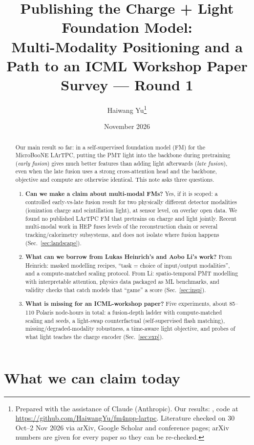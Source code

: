 \documentclass[11pt,a4paper]{article}
\title{\textbf{Publishing the Charge + Light Foundation Model:\\ Multi-Modality Positioning and a Path to an ICML Workshop Paper}\\[4pt]
\large Survey --- Round 1}
\author{Haiwang Yu\thanks{Prepared with the assistance of Claude (Anthropic). Our results: \code{docs/technote-round\{1,2,3,4\}.pdf}, code at \url{https://github.com/HaiwangYu/fm4npp-lartpc}. Literature checked on 30 Oct--2 Nov 2026 via arXiv, Google Scholar and conference pages; arXiv numbers are given for every paper so they can be re-checked.}}
\date{November 2026}
\begin{document}
\maketitle

\begin{abstract}
\noindent
Our main result so far: in a self-supervised foundation model (FM) for the MicroBooNE LArTPC, putting the PMT light into the backbone during pretraining (\emph{early fusion}) gives much better features than adding light afterwards (\emph{late fusion}), even when the late fusion uses a strong cross-attention head and the backbone, objective and compute are otherwise identical. This note asks three questions.
\begin{enumerate}
  \item \textbf{Can we make a claim about multi-modal FMs?} Yes, if it is scoped: a controlled early-vs-late fusion result for two physically different detector modalities (ionization charge and scintillation light), at sensor level, on overlay open data. We found no published LArTPC FM that pretrains on charge and light jointly. Recent multi-modal work in HEP fuses levels of the reconstruction chain or several tracking/calorimetry subsystems, and does not isolate where fusion happens (Sec.~\ref{sec:landscape}).
  \item \textbf{What can we borrow from Lukas Heinrich's and Aobo Li's work?} From Heinrich: masked modelling recipes, ``task = choice of input/output modalities'', and a compute-matched scaling protocol. From Li: spatio-temporal PMT modelling with interpretable attention, physics data packaged as ML benchmarks, and validity checks that catch models that ``game'' a score (Sec.~\ref{sec:insp}).
  \item \textbf{What is missing for an ICML-workshop paper?} Five experiments, about 85--110 Polaris node-hours in total: a fusion-depth ladder with compute-matched scaling and seeds, a light-swap counterfactual (self-supervised flash matching), missing/degraded-modality robustness, a time-aware light objective, and probes of what light teaches the charge encoder (Sec.~\ref{sec:exp}).
\end{enumerate}
\end{abstract}

\section{What we can claim today}\label{sec:claim}
\end{document}
